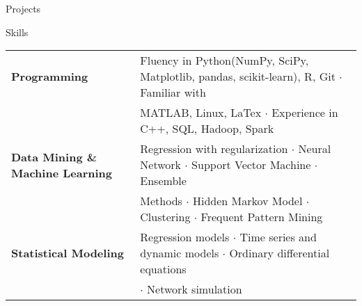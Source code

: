 \documentclass{my_resume} %
\begin{document}
\begin{rSection}{Projects}

\end{rSection}


\begin{rSection}{Skills}

\begin{tabular}{ @{} >{\bfseries}l @{\hspace{6ex}} l }
  Programming & Fluency in Python(NumPy, SciPy, Matplotlib, pandas,
  scikit-learn), R, Git {$\cdot$} Familiar with \\
  & MATLAB, Linux, LaTex {$\cdot$} Experience in C++, SQL, Hadoop, Spark\\
  Data Mining \& Machine Learning & Regression with regularization {$\cdot$}
  Neural Network {$\cdot$} Support Vector Machine {$\cdot$} Ensemble\\
  & Methods {$\cdot$} Hidden Markov Model {$\cdot$} Clustering {$\cdot$} Frequent Pattern Mining\\
  Statistical Modeling & Regression models {$\cdot$} Time series and dynamic
  models {$\cdot$} Ordinary differential equations \\
  & {$\cdot$} Network simulation\\
\end{tabular}
\end{rSection}

\end{document}
